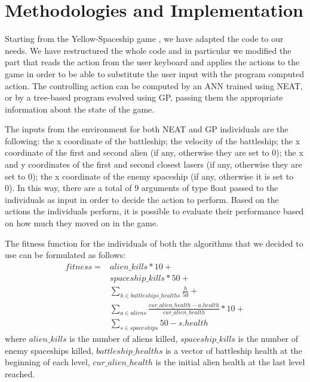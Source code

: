 \section{Methodologies and Implementation}
Starting from the Yellow-Spaceship game \cite{Yellow-Spaceship}, we have adapted the code to our needs. We
have restructured the whole code and in particular we modified the part that reads the action
from the user keyboard and applies the actions to the game in order to be able to substitute
the user input with the program computed action. The controlling action can be computed by
an ANN trained using NEAT, or by a tree-based program evolved using GP, passing them
the appropriate information about the state of the game.

The inputs from the environment for both NEAT and GP individuals are the following:
the x coordinate of the battleship; the velocity of the battleship;
the x coordinate of the first and second alien (if any, otherwise they are set to 0);
the x and y coordinates of the first and second closest lasers (if any, otherwise they are set to 0);
the x coordinate of the enemy spaceship (if any, otherwise it is set to 0).
In this way, there are a total of 9 arguments of type float passed to the individuals as input in
order to decide the action to perform. Based on the actions the individuals perform, it is
possible to evaluate their performance based on how much they moved on in the game.

The fitness function for the individuals of both the algorithms that we decided to use can be
formulated as follows:
\begin{equation}
\begin{split}
    fitness = & alien\_kills * 10 + \\
              & spaceship\_kills * 50 + \\
              & \sum_{h \in battleships\_healths}^{} \frac{h}{50} + \\
              & \sum_{a \in aliens}^{} \frac{cur\_alien\_health - a.health}{cur\_alien\_health} * 10 + \\
              & \sum_{s \in spaceships}^{} 50 - s.health
\end{split}
\end{equation}
where $alien\_kills$ is the number of aliens killed, 
$spaceship\_kills$ is the number of enemy spaceships killed,
$battleship\_healths$ is a vector of battleship health at the beginning of each level,
$cur\_alien\_health$ is the initial alien health at the last level reached. 

